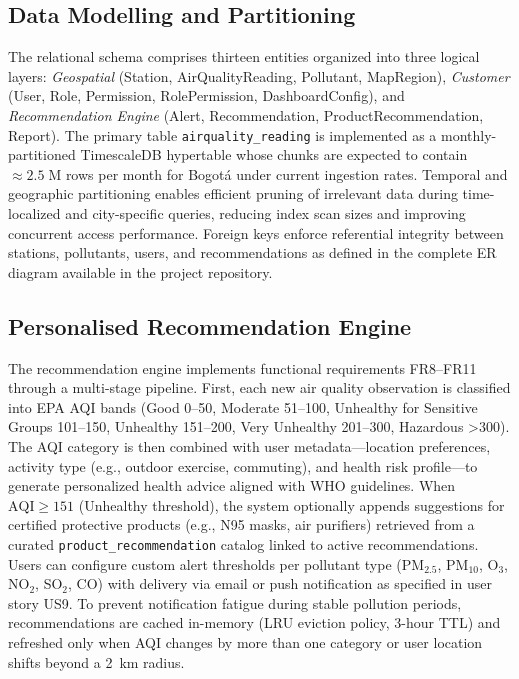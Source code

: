 \subsection{Data Modelling and Partitioning}\label{subsec:partitioning}
The relational schema comprises thirteen entities organized into three logical layers: \textit{Geospatial} (Station, AirQualityReading, Pollutant, MapRegion), \textit{Customer} (User, Role, Permission, RolePermission, DashboardConfig), and \textit{Recommendation Engine} (Alert, Recommendation, ProductRecommendation, Report).  
The primary table \texttt{airquality\_reading} is implemented as a monthly-partitioned TimescaleDB hypertable whose chunks are expected to contain \(\approx\!2.5\;\mathrm{M}\) rows per month for Bogotá under current ingestion rates\cite{timescale}.  
Temporal and geographic partitioning enables efficient pruning of irrelevant data during time-localized and city-specific queries, reducing index scan sizes and improving concurrent access performance.  
Foreign keys enforce referential integrity between stations, pollutants, users, and recommendations as defined in the complete ER diagram available in the project repository.

\subsection{Personalised Recommendation Engine}\label{subsec:reco}
The recommendation engine implements functional requirements FR8–FR11 through a multi-stage pipeline.  
First, each new air quality observation is classified into EPA AQI bands (Good 0–50, Moderate 51–100, Unhealthy for Sensitive Groups 101–150, Unhealthy 151–200, Very Unhealthy 201–300, Hazardous >300)\cite{epaaqi}.  
The AQI category is then combined with user metadata—location preferences, activity type (e.g., outdoor exercise, commuting), and health risk profile—to generate personalized health advice aligned with WHO guidelines\cite{whoaq}.  
When \(\text{AQI}\ge151\) (Unhealthy threshold), the system optionally appends suggestions for certified protective products (e.g., N95 masks, air purifiers) retrieved from a curated \texttt{product\_recommendation} catalog linked to active recommendations.  
Users can configure custom alert thresholds per pollutant type (PM$_{2.5}$, PM$_{10}$, O$_3$, NO$_2$, SO$_2$, CO) with delivery via email or push notification as specified in user story US9.  
To prevent notification fatigue during stable pollution periods, recommendations are cached in-memory (LRU eviction policy, 3-hour TTL) and refreshed only when AQI changes by more than one category or user location shifts beyond a 2~km radius.

